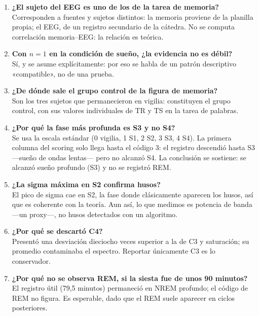\documentclass[11pt,a4paper]{article}
\begin{document}
\begin{enumerate}[label=\textbf{\arabic*.},leftmargin=2em]
\item \textbf{¿El sujeto del EEG es uno de los de la tarea de memoria?}\\
Corresponden a fuentes y sujetos distintos: la memoria proviene de la planilla propia; el EEG, de un
registro secundario de la cátedra. No se computa correlación memoria--EEG: la relación es teórica.

\item \textbf{Con $n=1$ en la condición de sueño, ¿la evidencia no es débil?}\\
Sí, y se asume explícitamente: por eso se habla de un patrón descriptivo «compatible», no de una prueba.

\item \textbf{¿De dónde sale el grupo control de la figura de memoria?}\\
Son los tres sujetos que permanecieron en vigilia: constituyen el grupo control, con sus valores
individuales de TR y TS en la tarea de palabras.

\item \textbf{¿Por qué la fase más profunda es S3 y no S4?}\\
Se usa la escala estándar (0 vigilia, 1 S1, 2 S2, 3 S3, 4 S4). La primera columna del scoring solo llega
hasta el código 3: el registro descendió hasta S3 ---sueño de ondas lentas--- pero no alcanzó S4. La
conclusión se sostiene: se alcanzó sueño profundo (S3) y no se registró REM.

\item \textbf{¿La sigma máxima en S2 confirma husos?}\\
El pico de sigma cae en S2, la fase donde clásicamente aparecen los husos, así que es coherente con la
teoría. Aun así, lo que medimos es potencia de banda ---un proxy---, no husos detectados con un algoritmo.

\item \textbf{¿Por qué se descartó C4?}\\
Presentó una desviación dieciocho veces superior a la de C3 y saturación; su promedio contaminaba el
espectro. Reportar únicamente C3 es lo conservador.

\item \textbf{¿Por qué no se observa REM, si la siesta fue de unos 90 minutos?}\\
El registro útil (79,5 minutos) permaneció en NREM profundo; el código de REM no figura. Es esperable,
dado que el REM suele aparecer en ciclos posteriores.


\end{enumerate}
\end{document}
